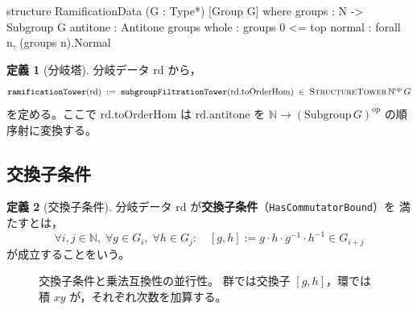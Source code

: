 \documentclass[a4paper,11pt]{ltjsarticle}
\theoremstyle{definition}
\newtheorem{definition}{定義}[section]
\theoremstyle{plain}
\theoremstyle{remark}
\begin{document}
\begin{leancode}
structure RamificationData (G : Type*) [Group G] where
  groups : N -> Subgroup G
  antitone : Antitone groups
  whole : groups 0 <= top
  normal : forall n, (groups n).Normal
\end{leancode}

\begin{definition}[分岐塔]\label{def:ramification-tower}
  分岐データ $\mathrm{rd}$ から，
  \[
    \texttt{ramificationTower}(\mathrm{rd})
    \;:=\;
    \texttt{subgroupFiltrationTower}(\mathrm{rd.toOrderHom})
    \;\in\;
    \textsc{StructureTower}\,\mathbb{N}^{\mathrm{op}}\,G
  \]
  を定める。ここで $\mathrm{rd.toOrderHom}$ は
  $\mathrm{rd.antitone}$ を $\mathbb{N} \to (\mathrm{Subgroup}\,G)^{\mathrm{op}}$
  の順序射に変換する。
\end{definition}

\subsection{交換子条件}

\begin{definition}[交換子条件]\label{def:commutator-bound}
  分岐データ $\mathrm{rd}$ が\textbf{交換子条件}（\texttt{HasCommutatorBound}）を
  満たすとは，
  \[
    \forall i,j \in \mathbb{N},\;\forall g \in G_i,\;\forall h \in G_j\colon
    \quad [g,h] := g \cdot h \cdot g^{-1} \cdot h^{-1} \in G_{i+j}
  \]
  が成立することをいう。
\end{definition}

\begin{figure}[H]
\centering
{}
\caption{交換子条件と乗法互換性の並行性。
群では交換子 $[g,h]$，環では積 $xy$ が，それぞれ次数を加算する。}
\label{fig:commutator-vs-product}
\end{figure}
\end{document}
